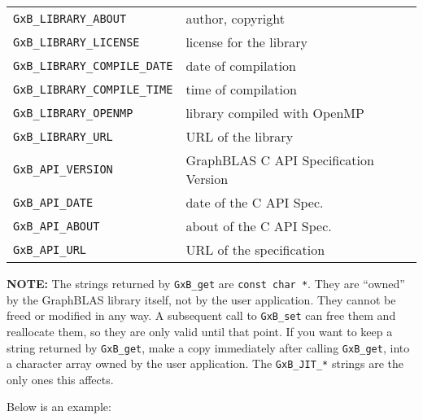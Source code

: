 \documentclass[12pt]{article}
\begin{document}
{\begin{tabular}{ll}
        \verb'GxB_LIBRARY_ABOUT'        & author, copyright \\
        \verb'GxB_LIBRARY_LICENSE'      & license for the library \\
        \verb'GxB_LIBRARY_COMPILE_DATE' & date of compilation \\
        \verb'GxB_LIBRARY_COMPILE_TIME' & time of compilation \\
        \verb'GxB_LIBRARY_OPENMP'       & library compiled with OpenMP\\
        \verb'GxB_LIBRARY_URL'          & URL of the library \\
        \hline
        \verb'GxB_API_VERSION'  & GraphBLAS C API Specification Version \\
        \verb'GxB_API_DATE'     & date of the C API Spec.  \\
        \verb'GxB_API_ABOUT'    & about of the C API Spec. \\
        \verb'GxB_API_URL'      & URL of the specification \\
        \hline
\end{tabular}
}
\vspace{0.2in}

{\bf NOTE:} The strings returned by \verb'GxB_get' are \verb'const char *'.
They are ``owned'' by the GraphBLAS library itself, not by the user
application.  They cannot be freed or modified in any way.  A subsequent call
to \verb'GxB_set' can free them and reallocate them, so they are only valid
until that point.  If you want to keep a string returned by \verb'GxB_get',
make a copy immediately after calling \verb'GxB_get', into a character array
owned by the user application.  The \verb'GxB_JIT_*' strings are the only ones
this affects.

Below is an example:
\end{document}
